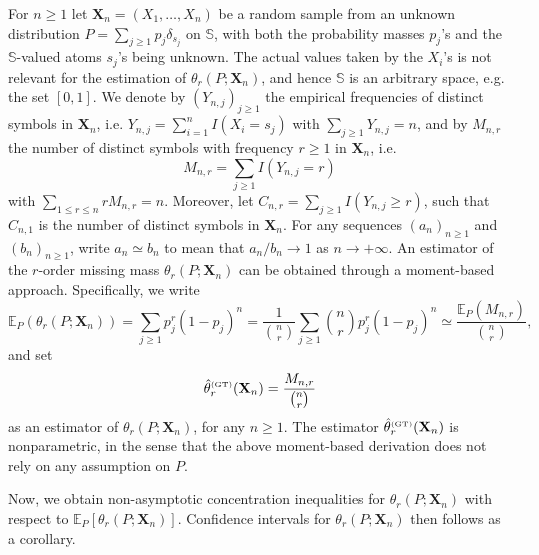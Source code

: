 \documentclass{article}
\newcommand{\1}{\boldsymbol{1}}
\theoremstyle{plain}
\begin{document}
For $n\geq1$ let $\mathbf{X}_{n}=(X_{1},\ldots,X_{n})$ be a random sample from an unknown distribution $P=\sum_{j\geq1}p_{j}\delta_{s_{j}}$ on $\mathbb{S}$, with both the probability masses $p_{j}$'s and the $\mathbb{S}$-valued atoms $s_{j}$'s being unknown. The actual values taken by the $X_{i}$'s is not relevant for the estimation of $\theta_{r}(P;\mathbf{X}_{n})$, and hence $\mathbb{S}$ is an arbitrary space, e.g. the set $[0,1]$. We denote by $(Y_{n,j})_{j\geq1}$ the empirical frequencies of distinct symbols in $\mathbf{X}_{n}$, i.e. $Y_{n,j}=\sum_{i=1}^{n}I(X_{i}=s_{j})$ with $\sum_{j\geq1}Y_{n,j}=n$, and by $M_{n,r}$ the number of distinct symbols with frequency $r\geq1$ in $\mathbf{X}_{n}$, i.e. 
\begin{displaymath}
M_{n,r}=\sum_{j\geq1}I(Y_{n,j}=r)
\end{displaymath}
with $\sum_{1\leq r\leq n}rM_{n,r}=n$. Moreover, let $C_{n,r}=\sum_{j\geq1}I(Y_{n,j}\geq r)$, such that $C_{n,1}$ is  the number of distinct symbols in $\mathbf{X}_{n}$. For any sequences $(a_n)_{n \geq 1}$ and $(b_n)_{n \geq 1}$, write $a_n\simeq b_n$ to mean that $a_{n}/b_{n}\rightarrow1$ as $n\rightarrow+\infty$. An estimator of the $r$-order missing mass $\theta_{r}(P;\mathbf{X}_{n})$ can be obtained through a moment-based approach. Specifically, we write
\begin{equation*}
\mathbb{E}_{P}(\theta_{r}(P;\mathbf{X}_{n}))= \sum_{j \geq 1} p_j^{r}(1-p_j)^{n}=\frac{1}{{n \choose r}} \sum_{j \geq 1} {n \choose r} p_j^{r}(1-p_j)^{n}\simeq \frac{\mathbb{E}_{P} (M_{n,r})}{{n \choose r}},
\end{equation*}
and set
\begin{displaymath}
\hat{\theta}_{r}^{\text{\tiny{(GT)}}}(\mathbf{X}_{n})=\frac{M_{n,r}}{{n\choose r}}
\end{displaymath}
as an estimator of $\theta_{r}(P;\mathbf{X}_{n})$, for any $n\geq1$. The estimator $\hat{\theta}_{r}^{\text{\tiny{(GT)}}}(\mathbf{X}_{n})$ is nonparametric, in the sense that the above moment-based derivation does not rely on any assumption on $P$.

Now, we obtain non-asymptotic concentration inequalities for $\theta_r(P;\mathbf{X}_{n})$ with respect to $\mathbb{E}_{P}[\theta_r(P;\mathbf{X}_{n})]$. Confidence intervals for $\theta_r(P;\mathbf{X}_{n})$ then follows as a corollary.
\end{document}
